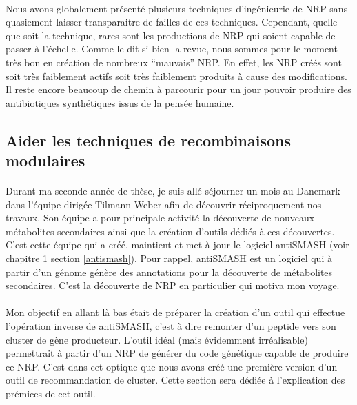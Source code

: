 \documentclass[12pt,french,twoside]{report}
\begin{document}
\paragraph{}Nous avons globalement présenté plusieurs techniques d'ingénieurie de NRP sans quasiement laisser transparaitre de failles de ces techniques.
Cependant, quelle que soit la technique, rares sont les productions de NRP qui soient capable de passer à l'échelle.
Comme le dit si bien la revue, nous sommes pour le moment très bon en création de nombreux ``mauvais'' NRP.
En effet, les NRP créés sont soit très faiblement actifs soit très faiblement produits à cause des modifications.
Il reste encore beaucoup de chemin à parcourir pour un jour pouvoir produire des antibiotiques synthétiques issus de la pensée humaine.


\subsection{Aider les techniques de recombinaisons modulaires}

\paragraph{}Durant ma seconde année de thèse, je suis allé séjourner un mois au Danemark dans l'équipe dirigée Tilmann Weber afin de découvrir réciproquement nos travaux.
Son équipe a pour principale activité la découverte de nouveaux métabolites secondaires ainsi que la création d'outils dédiés à ces découvertes.
C'est cette équipe qui a créé, maintient et met à jour le logiciel antiSMASH (voir chapitre 1 section \ref{antismash}).
Pour rappel, antiSMASH est un logiciel qui à partir d'un génome génère des annotations pour la découverte de métabolites secondaires.
C'est la découverte de NRP en particulier qui motiva mon voyage.

\paragraph{}Mon objectif en allant là bas était de préparer la création d'un outil qui effectue l'opération inverse de antiSMASH, c'est à dire remonter d'un peptide vers son cluster de gène producteur.
L'outil idéal (mais évidemment irréalisable) permettrait à partir d'un NRP de générer du code génétique capable de produire ce NRP.
C'est dans cet optique que nous avons créé une première version d'un outil de recommandation de cluster.
Cette section sera dédiée à l'explication des prémices de cet outil.
\end{document}
